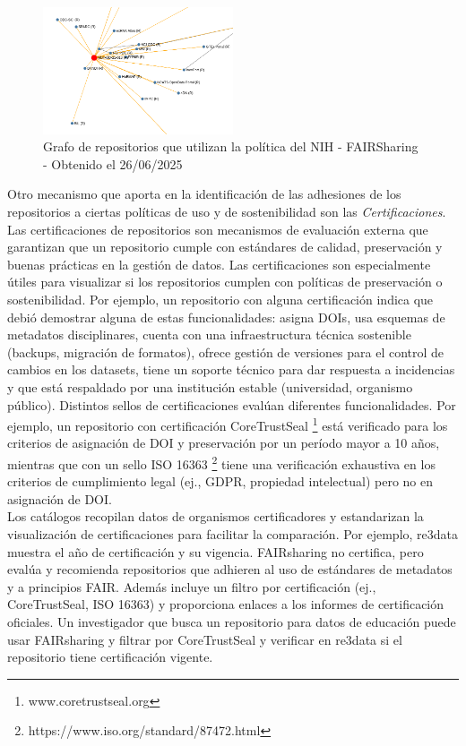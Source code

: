 \documentclass[runningheads]{llncs}
\begin{document}
\begin{figure}[h]
    \includegraphics[width=0.5\textwidth]{img/FAIRSharing_NIHPol_Repos.png}
    \caption{
    Grafo de repositorios que utilizan la política del NIH - FAIRSharing - Obtenido el 26/06/2025
    }
    \label{fig:fairsharing_nih_policy_repo_usages}
\end{figure}

Otro mecanismo que aporta en la identificación de las adhesiones de los repositorios a ciertas políticas de uso y de sostenibilidad son las \emph{Certificaciones}. Las certificaciones de repositorios son mecanismos de evaluación externa que garantizan que un repositorio cumple con estándares de calidad, preservación y buenas prácticas en la gestión de datos. Las certificaciones son especialmente útiles para visualizar si los repositorios cumplen con políticas de preservación o sostenibilidad. Por ejemplo, un repositorio con alguna certificación indica que debió demostrar alguna de estas funcionalidades: asigna DOIs, usa esquemas de metadatos disciplinares,  cuenta con una infraestructura técnica sostenible (backups, migración de formatos), ofrece gestión de versiones para el control de cambios en los datasets, tiene un soporte técnico para dar respuesta a incidencias y que está respaldado por una institución estable (universidad, organismo público). Distintos sellos de certificaciones evalúan diferentes funcionalidades. Por ejemplo, un repositorio con certificación CoreTrustSeal \footnote{ www.coretrustseal.org} está verificado para los criterios de asignación de DOI y preservación por un período mayor a 10 años, mientras que con un sello ISO 16363 \footnote{https://www.iso.org/standard/87472.html} tiene una verificación exhaustiva en los criterios de cumplimiento legal (ej., GDPR, propiedad intelectual) pero no en asignación de DOI.\\



Los catálogos recopilan datos de organismos certificadores y estandarizan la visualización de certificaciones para facilitar la comparación. Por ejemplo, re3data muestra el año de certificación y su vigencia.  FAIRsharing no certifica, pero evalúa y recomienda repositorios que adhieren al uso de estándares de metadatos y a principios FAIR. Además incluye un filtro por certificación (ej., CoreTrustSeal, ISO 16363) y proporciona enlaces a los informes de certificación oficiales. Un investigador que busca un repositorio para datos de educación puede usar FAIRsharing y filtrar por CoreTrustSeal y verificar en re3data si el repositorio tiene certificación vigente.
\end{document}
